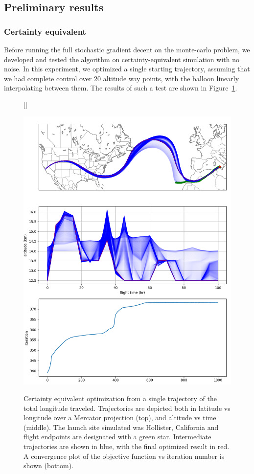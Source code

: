 \documentclass[11pt]{scrartcl} %
\begin{document}
\newpage
\subsection{Preliminary results}
\subsubsection{Certainty equivalent}
Before running the full stochastic gradient decent on the monte-carlo problem, we developed and tested the algorithm on certainty-equivalent simulation with no noise. In this experiment, we optimized a single starting trajectory, assuming that we had complete control over 20 altitude way points, with the balloon linearly interpolating between them. The results of such a test are shown in Figure~\ref{ce}. 

\begin{figure}[h!]
[\FBwidth]
{\caption{Certainty equivalent optimization from a single trajectory of the total longitude traveled. Trajectories are depicted both in latitude vs longitude over a Mercator projection (top), and altitude vs time (middle). The launch site simulated was Hollister, California and flight endpoints are designated with a green star. Intermediate trajectories are shown in blue, with the final optimized result in red. A convergence plot of the objective function vs iteration number is shown (bottom).}\label{ce}}
{\includegraphics[width=1\linewidth]{certaintyeq.png}}
\end{figure}
\end{document}
